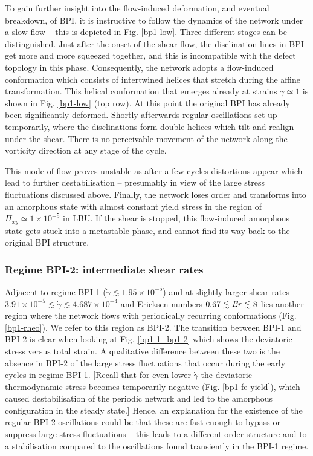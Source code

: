 \documentclass[aps,pre,reprint,superscriptaddress, twocolumn]{revtex4}
\newcommand{\e}[1]{\times10^{#1}}
\newcommand{\gd}{\dot{\gamma}}
\begin{document}
To gain further insight into the flow-induced deformation, and eventual
breakdown, of BPI, it is instructive to follow the dynamics of 
the network under a slow flow -- this is depicted in Fig. \ref{bp1-low}.
Three different stages can be distinguished. 
Just after the onset of the shear flow, the disclination lines 
in BPI get more and more squeezed together, and this is incompatible with
the defect topology in this phase.
Consequently, the network adopts a flow-induced conformation which consists 
of intertwined helices that stretch during the affine transformation.
This helical conformation that emerges already at strains $\gamma\simeq1$ 
is shown in Fig. \ref{bp1-low} (top row).
At this point the original BPI has already been significantly deformed.
Shortly afterwards regular oscillations set up temporarily,
where the disclinations form double helices which tilt and realign under the shear.
There is no perceivable movement of the 
network along the vorticity direction at any stage of the cycle.

This mode of flow proves unstable as after a few cycles 
distortions appear which lead to further destabilisation -- presumably in
view of the large stress fluctuations discussed above. 
Finally, the network loses order and 
transforms into an amorphous state with almost constant
yield stress in the region of $\Pi_{xy}\simeq 1\e{-5}$ in LBU.
If the shear is stopped, this flow-induced amorphous state
gets stuck into a metastable phase, and cannot
find its way back to the original BPI structure.

\subsubsection{Regime BPI-2: intermediate shear rates}

Adjacent to regime BPI-1 ($\gd\lesssim1.95\e{-5}$) and 
at slightly larger shear rates $3.91\e{-5}\lesssim\gd\lesssim 4.687\e{-4}$
and Ericksen numbers $0.67\lesssim{\it Er}\lesssim8$ 
lies another region where the network flows with periodically 
recurring conformations (Fig. \ref{bp1-rheo}). 
We refer to this region as BPI-2. The transition between BPI-1 and BPI-2 
is clear when looking at Fig. \ref{bp1-1_bp1-2} 
which shows the deviatoric stress versus total strain. 
A qualitative difference between these two is the absence in BPI-2 of the 
large stress fluctuations that occur during the early cycles in regime BPI-1.
[Recall that for even lower $\gd$ the deviatoric thermodynamic stress becomes 
temporarily negative (Fig. \ref{bp1-fe-yield}), which 
caused destabilisation of the periodic network and led to the 
amorphous configuration in the steady state.] Hence, an explanation
for the existence of the regular BPI-2 oscillations 
could be that these are fast enough to bypass or suppress 
large stress fluctuations -- this leads to
a different order structure and to a stabilisation 
compared to the oscillations found transiently in
the BPI-1 regime.
\end{document}
